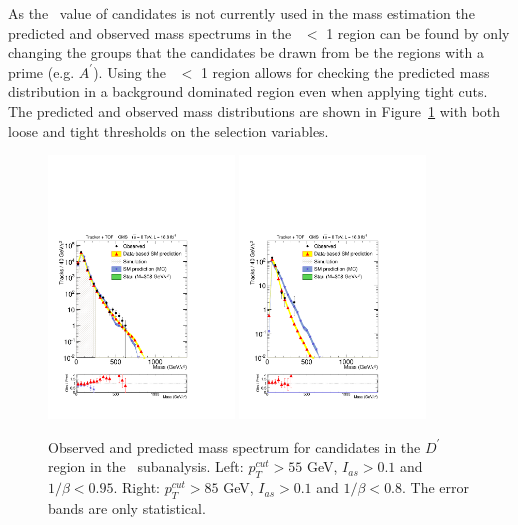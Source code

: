 As the \invbeta\ value of candidates is not currently used in the mass estimation the predicted and observed mass spectrums in the \invbeta\ $<$ 1 region can be
found by only changing the groups that the candidates be drawn from be the regions with a prime (e.g. $A^\prime$). Using the \invbeta\ $<$ 1 region allows for checking
the predicted mass distribution in a background dominated region even when applying tight cuts. The predicted and observed mass distributions are shown in 
Figure~\ref{fig:FlipMassDistribution} with both loose and tight thresholds on the selection variables.

\begin{figure}
 \begin{center}
  \includegraphics[clip=true, trim=0.0cm 0cm 2.8cm 0cm,width=0.44\textwidth]{figures/tkmu/Rescale_Mass_Flip_8TeV_Loose}
  \includegraphics[clip=true, trim=0.0cm 0cm 2.8cm 0cm,width=0.44\textwidth]{figures/tkmu/Rescale_Mass_Flip_8TeV_Tight}
 \end{center}
 \caption{Observed and predicted mass spectrum for candidates in the $D^\prime$ region in the \tktof\ subanalysis.
Left: $p_T^{cut}>55$ GeV, $I_{as}>0.1$ and $1/\beta<0.95$.
Right: $p_T^{cut}>85$ GeV, $I_{as}>0.1$ and $1/\beta<0.8$.
The error bands are only statistical.
\label{fig:FlipMassDistribution}}
\end{figure}

